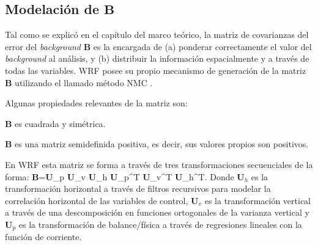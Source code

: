 \subsection{Modelación de $\textbf{B}$}
Tal como se explicó en el capítulo del marco teórico, la matriz de covarianzas del error del \emph{background} $\textbf{B}$ es la encargada de (a) ponderar correctamente el valor del \emph{background} al análisis, y (b) distribuir la información espacialmente y a través de todas las variables. WRF posee su propio mecanismo de generación de la matriz $\textbf{B}$ utilizando el llamado método NMC \citep{https://doi.org/10.5065/d68s4mvh}.

Algunas propiedades relevantes de la matriz son:
\begin{itemize*}
	\item $\textbf{B}$ es cuadrada y simétrica.
	\item $\textbf{B}$ es una matriz semidefinida positiva, es decir, sus valores propios son positivos. 
\end{itemize*}

En WRF esta matriz se forma a través de tres transformaciones secuenciales de la forma:
\be 
\textbf{B}=\textbf{U}_p \textbf{U}_v \textbf{U}_h \textbf{U}_p^T \textbf{U}_v^T \textbf{U}_h^T. 
\ee
Donde $\textbf{U}_h$ es la transformación horizontal a través de filtros recursivos para modelar la correlación horizontal de las variables de control, $\textbf{U}_v$ es la transformación vertical a través de una descomposición en funciones ortogonales de la varianza vertical y $\textbf{U}_p$ es la transformación de balance/física a través de regresiones lineales con la función de corriente.